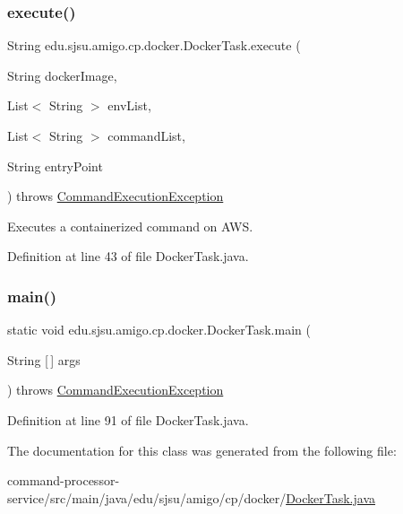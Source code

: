 \subsubsection{\texorpdfstring{execute()}{execute()}}
{\footnotesize\ttfamily String edu.\+sjsu.\+amigo.\+cp.\+docker.\+Docker\+Task.\+execute (\begin{DoxyParamCaption}\item[{String}]{docker\+Image,  }\item[{List$<$ String $>$}]{env\+List,  }\item[{List$<$ String $>$}]{command\+List,  }\item[{String}]{entry\+Point }\end{DoxyParamCaption}) throws \hyperlink{classedu_1_1sjsu_1_1amigo_1_1cp_1_1api_1_1_command_execution_exception}{Command\+Execution\+Exception}}

Executes a containerized command on A\+WS. 

Definition at line 43 of file Docker\+Task.\+java.

\mbox{\label{classedu_1_1sjsu_1_1amigo_1_1cp_1_1docker_1_1_docker_task_a21be6689ed6fbf01bc05c15fadf7bdd5}} 
\subsubsection{\texorpdfstring{main()}{main()}}
{\footnotesize\ttfamily static void edu.\+sjsu.\+amigo.\+cp.\+docker.\+Docker\+Task.\+main (\begin{DoxyParamCaption}\item[{String \mbox{[}$\,$\mbox{]}}]{args }\end{DoxyParamCaption}) throws \hyperlink{classedu_1_1sjsu_1_1amigo_1_1cp_1_1api_1_1_command_execution_exception}{Command\+Execution\+Exception}\hspace{0.3cm}{\ttfamily [static]}}



Definition at line 91 of file Docker\+Task.\+java.



The documentation for this class was generated from the following file\+:\begin{DoxyCompactItemize}
\item 
command-\/processor-\/service/src/main/java/edu/sjsu/amigo/cp/docker/\hyperlink{_docker_task_8java}{Docker\+Task.\+java}\end{DoxyCompactItemize}
